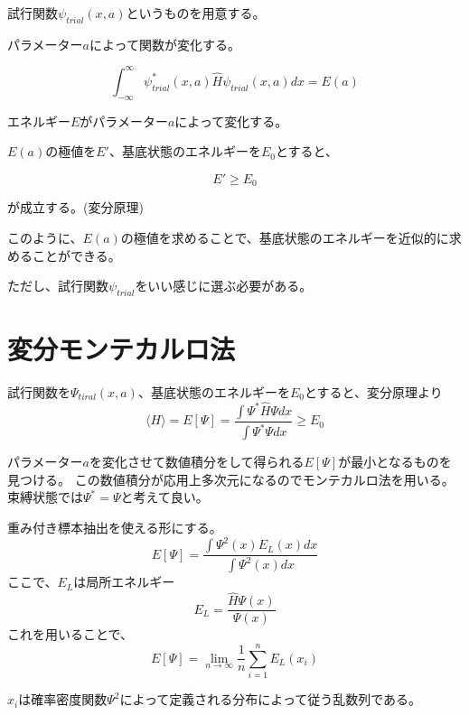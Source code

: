 \documentclass[dvipdfmx]{beamer}
\begin{document}
    \begin{frame}
        試行関数$\psi_{trial}(x,a)$というものを用意する。

        パラメーター$a$によって関数が変化する。

        \begin{equation}
            \int_{-\infty}^\infty \psi_{trial}^*(x,a) \hat{H} \psi_{trial}(x,a) dx = E(a)
        \end{equation}

        エネルギー$E$がパラメーター$a$によって変化する。

        $E(a)$の極値を$E'$、基底状態のエネルギーを$E_0$とすると、

        \begin{equation}
            E' \geq E_0
        \end{equation}

        が成立する。(変分原理)

        このように、\alert{$E(a)$の極値を求めることで、基底状態のエネルギーを近似的に求めることができる。}

        ただし、試行関数$\psi_{trial}$をいい感じに選ぶ必要がある。

    \end{frame}

    \section{変分モンテカルロ法}
    \begin{frame}
        試行関数を$\Psi_{tiral}(x,a)$、基底状態のエネルギーを$E_0$とすると、変分原理より
        \begin{equation}
            \langle H \rangle = E[\Psi] = \dfrac{\int\Psi^* \hat{H} \Psi dx}{\int \Psi^* \Psi dx} \geq E_0
        \end{equation}

        パラメーター$a$を変化させて数値積分をして得られる$E[\Psi]$が最小となるものを見つける。
        \vfill
        この数値積分が応用上多次元になるのでモンテカルロ法を用いる。
        \vfill
        束縛状態では$\Psi^* = \Psi$と考えて良い。
    \end{frame}

    \begin{frame}
        重み付き標本抽出を使える形にする。
        \begin{equation}
            E[\Psi] = \dfrac{\int \Psi^2(x) E_L(x) dx}{\int \Psi^2(x) dx}
        \end{equation}
        ここで、$E_L$は局所エネルギー
        \begin{equation}
            E_L = \dfrac{\hat{H}\Psi(x)}{\Psi(x)}
        \end{equation}
        これを用いることで、
        \begin{equation}
            E[\Psi] = \lim_{n\to\infty}\dfrac{1}{n}\sum_{i=1}^n E_L(x_i)
        \end{equation}

        $x_i$は確率密度関数$\Psi^2$によって定義される分布によって従う乱数列である。
    \end{frame}
\end{document}
